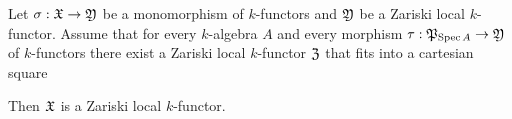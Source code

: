 \begin{proposition}\label{proposition:representablemonomorphismsaresheaves}
Let $\sigma:{\mathfrak X} \rightarrow {\mathfrak Y}$ be a monomorphism of $k$-functors and ${\mathfrak Y}$ be a Zariski local $k$-functor. Assume that for every $k$-algebra $A$ and every morphism $\tau:{\mathfrak P}_{\mathrm{Spec}\, A}\rightarrow {\mathfrak Y}$ of $k$-functors there exist a Zariski local $k$-functor ${\mathfrak Z}$ that fits into a cartesian square
\begin{center}
\end{center}
Then ${\mathfrak X}$ is a Zariski local $k$-functor.
\end{proposition}
